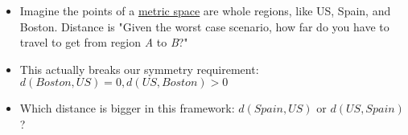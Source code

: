 \begin{itemize}
    \item Imagine the points of a \hyperref[D2.51]{metric space} are whole regions, like US, Spain, and Boston. Distance is "Given the worst case scenario, how far do you have to travel to get from region \emph{A} to \emph{B}?"
    \item This actually breaks our symmetry requirement: $d(Boston,US)=0, d(US,Boston) > 0$
    \item Which distance is bigger in this framework: $d(Spain,US)$ or $d(US,Spain)$?
  \end{itemize}